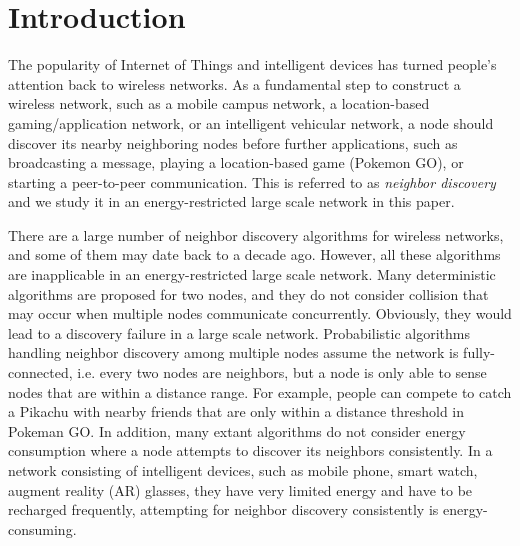 \section{Introduction}






The popularity of Internet of Things and intelligent devices has turned people's attention back to wireless networks\cite{gupta2000capacity}. As a fundamental step to construct a wireless network, such as a mobile campus network, a location-based gaming/application network, or an intelligent vehicular network, a node should discover its nearby neighboring nodes before further applications, such as broadcasting a message, playing a location-based game (Pokemon GO), or starting a peer-to-peer communication. This is referred to as \emph{neighbor discovery} and we study it in an energy-restricted large scale network in this paper.

There are a large number of neighbor discovery algorithms for wireless networks, and some of them may date back to a decade ago. 
However, all these algorithms are inapplicable in an energy-restricted large scale network. Many deterministic algorithms are proposed for two nodes\cite{dutta2008practical, kandhalu2010u, bakht2012searchlight, sun2014hello,  chen2015heterogeneous, wang2015blinddate, qiu2016talk}, and they do not consider collision that may occur when multiple nodes communicate concurrently. Obviously, they would lead to a discovery failure in a large scale network. Probabilistic algorithms handling neighbor discovery among multiple nodes\cite{mcglynn2001birthday, vasudevan2009neighbor, you2011aloha} assume the network is fully-connected, i.e. every two nodes are neighbors, but a node is only able to sense nodes that are within a distance range. For example, people can compete to catch a Pikachu with nearby friends that are only within a distance threshold in Pokeman GO. In addition, many extant algorithms do not consider energy consumption where a node attempts to discover its neighbors consistently.
In a network consisting of intelligent devices, such as mobile phone, smart watch, augment reality (AR) glasses, they have very limited energy and have to be recharged frequently, attempting for neighbor discovery consistently is energy-consuming. 

